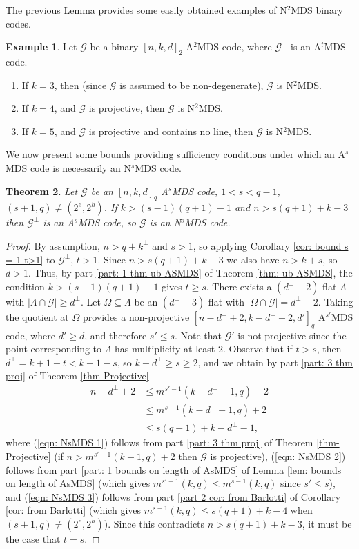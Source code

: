 \documentclass[11pt,a4paper]{amsart}
\newcommand{\AS}{ A$^s$MDS }
\newcommand{\AT}{ A$^t$MDS }
\newcommand{\G}{\mathcal{G}}
\theoremstyle{plain}
\newtheorem{theorem}{Theorem}[section]
\theoremstyle{definition}
\newtheorem{example}[theorem]{Example}
\theoremstyle{remark}
\begin{document}
	The previous Lemma provides some easily obtained examples of N$^2$MDS binary codes.
	\begin{example}
		Let $\G$ be a binary $[n,k,d]_2$ A$^2$MDS code, where $\G^\perp$ is an \AT code.
		\begin{enumerate}
			\item If $k=3$, then (since $\G$ is assumed to be non-degenerate), $\G$ is N$^2$MDS.
			\item If $k=4$, and $\G$ is projective, then $\G$ is N$^2$MDS.
			\item If $k=5$, and $\G$ is projective and contains no line, then $\G$ is N$^2$MDS.
		\end{enumerate}
	\end{example}

	We now present some bounds providing sufficiency conditions under which an A$^s$MDS code is necessarily an N$^s$MDS code.
	\begin{theorem}\label{thm: NMDS}
		Let $\G$ be an $[n,k,d]_q$ \AS code, $1< s < q-1$, $(s+1,q) \ne (2^e,2^h)$. If $k>(s-1)(q+1)-1$ and $n>s(q+1)+k-3$ then $\G^\perp$ is an \AS code, so $\G$ is an N$^s$MDS code.
	\end{theorem}
	\begin{proof}
		By assumption, $n>q+k^\perp$ and $s>1$, so applying Corollary \ref{cor: bound s = 1 t>1} to $\G^\perp$, $t>1$. Since $n>s(q+1)+k-3$ we also have $n>k+s$, so $d>1$. Thus, by part \ref{part: 1 thm ub ASMDS}  of Theorem \ref{thm: ub ASMDS}, the condition $k>(s-1)(q+1)-1$ gives $t\ge s$.  There exists a $(d^\perp-2)$-flat $\Lambda$ with $|\Lambda\cap \G|\ge d^\perp$. Let $\Omega\subseteq \Lambda$ be an $(d^\perp-3)$-flat with $|\Omega\cap \G|=d^\perp-2$. Taking the quotient at $\Omega$ provides a non-projective $[n-d^\perp+2, k-d^\perp+2,d']_q$ A$^{s'}$MDS code, where $d'\ge d$, and therefore $s'\le s$. Note that  $\G'$ is not projective since the point corresponding to $\Lambda$ has multiplicity at least $2$. Observe that if $t>s$, then $d^\perp =k+1-t<k+1-s$, so $k-d^\perp \ge s\ge 2$, and we obtain by  part \ref{part: 3 thm proj} of Theorem \ref{thm-Projective}
		\begin{align}
			n-d^\perp+2 & \le m^{s'-1}(k-d^\perp+1,q)+2  \label{eqn: NsMDS 1}\\
			& \le m^{s-1}(k-d^\perp+1,q)+2\label{eqn: NsMDS 2}\\
			&\le  s(q+1)+k-d^\perp -1,\label{eqn: NsMDS 3}
		\end{align}
		where (\ref{eqn: NsMDS 1}) follows from part \ref{part: 3 thm proj} of Theorem \ref{thm-Projective} (if $n > m^{s'-1}(k-1,q)+2$ then $\G$ is projective),  (\ref{eqn: NsMDS 2}) follows from part \ref{part: 1 bounds on length of AsMDS} of Lemma \ref{lem: bounds on length of AsMDS} (which gives $m^{s'-1}(k,q) \le m^{s-1}(k,q)$ since $s'\le s$), and  (\ref{eqn: NsMDS 3}) follows from  part  \ref{part 2 cor: from Barlotti} of Corollary \ref{cor: from Barlotti} (which gives $m^{s-1}(k,q)\le s(q+1)+k-4$ when $(s+1,q)\ne(2^e,2^h)$). Since this contradicts $n> s(q+1)+k-3$, it must be the case that $t=s$.
	\end{proof}
\end{document}
